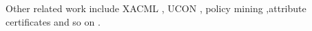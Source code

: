 	Other related work include XACML \cite{xacml}, UCON \cite{ucon}, policy mining \cite{mining},attribute certificates \cite{attribute-cert} and so on \cite{enforcing,lee,foley}.
	

	 
